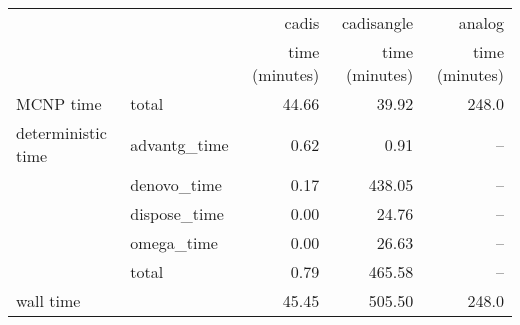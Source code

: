 \begin{tabular}{llrrr}
\toprule
          &              &          cadis &     cadisangle &         analog \\
          &              & time (minutes) & time (minutes) & time (minutes) \\
\midrule
MCNP time & total &          44.66 &          39.92 &          248.0 \\
deterministic time & advantg\_time &           0.62 &           0.91 &            -- \\
          & denovo\_time &           0.17 &         438.05 &            -- \\
          & dispose\_time &           0.00 &          24.76 &            -- \\
          & omega\_time &           0.00 &          26.63 &            -- \\
          & total &           0.79 &         465.58 &            -- \\
wall time &              &          45.45 &         505.50 &          248.0 \\
\bottomrule
\end{tabular}
